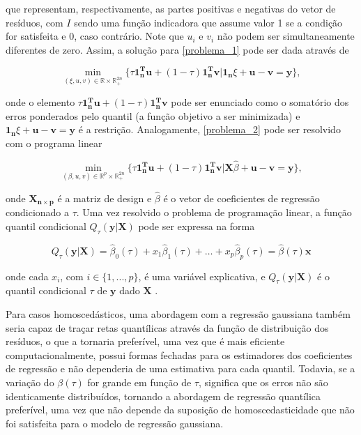 \noindent que representam, respectivamente, as partes positivas e negativas do vetor de resíduos, com $I$ sendo uma função indicadora que assume valor 1 se a condição for satisfeita e 0, caso contrário. Note que $u_i$ e $v_i$ não podem ser simultaneamente diferentes de zero. Assim, a solução para \ref{problema_1} pode ser dada através de

\begin{equation}
    \displaystyle \min_{(\xi, u, v) \in \mathbb{R} \times \mathbb{R}_+ ^ {2n}} \{\tau \mathbf{ 1 _n ^ T u} + (1 - \tau) \mathbf{ 1_n ^ T v} | \mathbf{1_n}\xi + \mathbf{u - v = y}\},
\end{equation}

\noindent onde o elemento $\tau \mathbf{ 1 _n ^ T u} + (1 - \tau) \mathbf{1_n ^ T v}$ pode ser enunciado como o somatório dos erros ponderados pelo quantil (a função objetivo a ser minimizada) e $\mathbf{1_n}\xi + \mathbf{u - v = y}$ é a restrição. Analogamente, \ref{problema_2} pode ser resolvido com o programa linear

\begin{equation}
    \displaystyle \min_{(\beta, u, v) \in \mathbb{R} ^ p \times \mathbb{R}_+ ^ {2n}} \{\tau \mathbf{ 1 _n ^ T u} + (1 - \tau) \mathbf{ 1_n ^ T v} | \mathbf{X}\hat{\beta} + \mathbf{u - v = y}\},
\end{equation}

\noindent onde $\mathbf{X_{n\times p}}$ é a matriz de design e $\hat{\beta}$ é o vetor de coeficientes de regressão condicionado a $\tau$. Uma vez resolvido o problema de programação linear, a função quantil condicional $Q_\tau(\mathbf{y | X})$ pode ser expressa na forma

\begin{equation}
Q_\tau(\mathbf{y | X}) = \hat{\beta}_0(\tau) + x_1 \hat{\beta}_1(\tau) + \dots + x_p \hat{\beta}_p(\tau)  = \hat{\beta} (\tau) \mathbf{x}
\end{equation}

\noindent onde cada $x_{i}$, com $i \in \{1, ..., p\}$, é uma variável explicativa, e $Q_\tau(\mathbf{y | X})$ é o quantil condicional $\tau$ de $\mathbf{y}$ dado $\mathbf{X}$  \cite{koenker2005}. 

Para casos homoscedásticos, uma abordagem com a regressão gaussiana também seria capaz de traçar retas quantílicas através da função de distribuição dos resíduos, o que a tornaria preferível, uma vez que é mais eficiente computacionalmente, possui formas fechadas para os estimadores dos coeficientes de regressão e não dependeria de uma estimativa para cada quantil. Todavia, se a variação do $\beta(\tau)$ for grande em função de $\tau$, significa que os erros não são identicamente distribuídos, tornando a abordagem de regressão quantílica preferível, uma vez que não depende da suposição de homoscedasticidade que não foi satisfeita para o modelo de regressão gaussiana.

